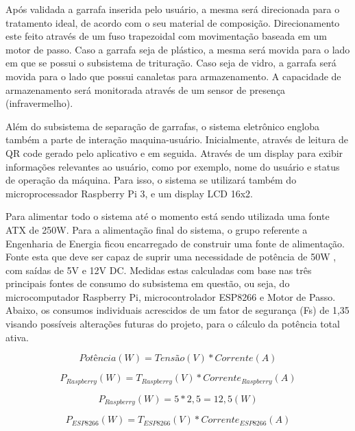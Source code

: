 Após validada a garrafa inserida pelo usuário, a mesma será direcionada para o tratamento ideal, de acordo com o seu material de composição. Direcionamento este feito através de um fuso trapezoidal com movimentação baseada em um motor de passo. Caso a garrafa seja de plástico, a mesma será movida para o lado em que se possui o subsistema de trituração. Caso seja de vidro, a garrafa será movida para o lado que possui canaletas para armazenamento.  A capacidade de armazenamento será monitorada através de um sensor de presença (infravermelho).
 
Além do subsistema de separação de garrafas, o sistema eletrônico engloba também a parte de interação maquina-usuário. Inicialmente, através de leitura de QR code gerado pelo aplicativo e em seguida. Através de um display para exibir informações relevantes ao usuário, como por exemplo, nome do usuário e status de operação da máquina. Para isso, o sistema se utilizará também do microprocessador Raspberry Pi 3, e um display LCD 16x2.

Para alimentar todo o sistema até o momento está sendo utilizada uma fonte ATX de 250W. Para a alimentação final do sistema, o grupo referente a Engenharia de Energia ficou encarregado de construir uma fonte de alimentação. Fonte esta que deve ser capaz de suprir uma necessidade de potência de 50W , com saídas de 5V e 12V DC.
Medidas estas calculadas com base nas três principais fontes de consumo do subsistema em questão, ou seja, do microcomputador Raspberry Pi, microcontrolador ESP8266 e Motor de Passo. Abaixo, os consumos individuais acrescidos de um fator de segurança (Fs) de 1,35 visando possíveis alterações futuras do projeto, para o cálculo da potência total ativa.

\begin{equation}
    Potência\left ( W \right ) = Tensão\left ( V \right ) \ast Corrente\left ( A \right )
\end{equation}

\begin{equation}
    P_{Raspberry}\left ( W \right ) = T_{Raspberry}\left ( V \right ) \ast Corrente_{Raspberry}\left ( A \right )
\end{equation}

\begin{equation}
    P_{Raspberry}\left ( W \right ) = 5 \ast 2,5 = 12,5 \left ( W \right )
\end{equation}

\begin{equation}
    P_{ESP8266}\left ( W \right ) = T_{ESP8266}\left (V \right ) \ast Corrente_{ESP8266} \left ( A \right )
\end{equation}

